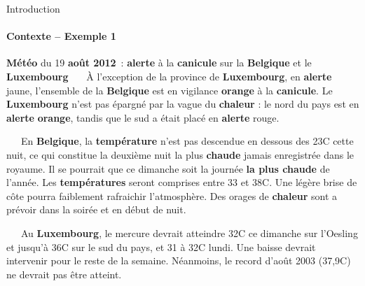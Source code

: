 \begin{frame}{Introduction}\framesubtitle{Contexte -- Exemple 1}
  \begin{exampleblock}{\small
    \textbf{\normalsize Météo} du 19 \textbf{\normalsize août 2012}~:
    \textbf{\normalsize alerte} à la \textbf{\normalsize canicule} sur la
    \textbf{\normalsize Belgique} et le \textbf{\normalsize Luxembourg}
  }\justifying\small
    ~~~À l'exception de la province de \textbf{\normalsize Luxembourg}, en
    \textbf{\normalsize alerte} jaune, l'ensemble de la \textbf{\normalsize
    Belgique} est en vigilance \textbf{\normalsize orange} à la
    \textbf{\normalsize canicule}. Le \textbf{\normalsize Luxembourg} n'est pas
    épargné par la vague du \textbf{\normalsize chaleur} : le nord du pays est
    en \textbf{\normalsize alerte} \textbf{\normalsize orange}, tandis que le
    sud a était placé en \textbf{\normalsize alerte} rouge.

    ~~~En \textbf{\normalsize Belgique}, la \textbf{\normalsize température}
    n'est pas descendue en dessous des 23\degre{}C cette nuit, ce qui constitue
    la deuxième nuit la plus \textbf{\normalsize chaude} jamais enregistrée dans
    le royaume. Il se pourrait que ce dimanche soit la journée
    \textbf{\normalsize la plus chaude} de l'année. Les \textbf{\normalsize
    températures} seront comprises entre 33 et 38\degre{}C. Une légère brise de
    côte pourra faiblement rafraichir l'atmosphère. Des orages de
    \textbf{\normalsize chaleur} sont a prévoir dans la soirée et en début de
    nuit.

    ~~~Au \textbf{\normalsize Luxembourg}, le mercure devrait atteindre
    32\degre{}C ce dimanche sur l'Oesling et jusqu'à 36\degre{}C sur le sud du
    pays, et 31 à 32\degre{}C lundi. Une baisse devrait intervenir pour le reste
    de la semaine. Néanmoins, le record d'août 2003 (37,9\degre{}C) ne devrait
    pas être atteint.
  \end{exampleblock}
\end{frame}

